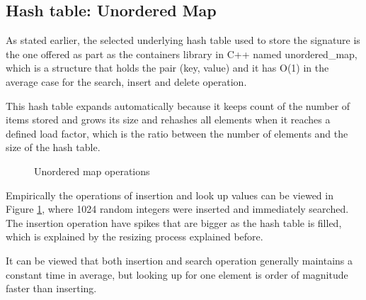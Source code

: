 \documentclass[a4paper,12pt]{article}
\begin{document}
\subsection{Hash table: Unordered Map} \label{hashTable}
As stated earlier, the selected underlying hash table used to store the signature is the one offered as part as the containers library in C++ named unordered\_map, which is a structure that holds the pair (key, value) and it has O(1) in the average case for the search, insert and delete operation.

This hash table expands automatically because it keeps count of the number of items stored and grows its size and rehashes all elements when it reaches a defined load factor, which is the ratio between the number of elements and the size of the hash table. 

\begin{figure}[H]
\centering
{}%
\hfill %
%
\caption{Unordered map operations}
\label{fig:hashTableFig}
\end{figure}

Empirically the operations of insertion and look up values can be viewed in Figure \ref{fig:hashTableFig}, where 1024 random integers were inserted and immediately searched. The insertion operation have spikes that are bigger as the hash table is filled, which is explained by the resizing process explained before. 

It can be viewed that both insertion and search operation generally maintains a constant time in average, but looking up for one element is order of magnitude faster than inserting. \\
\end{document}
